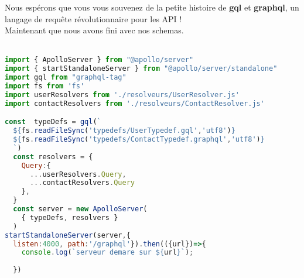 \documentclass{article}
\begin{document}
Nous espérons que vous vous souvenez de la petite histoire de \textbf{gql} et \textbf{graphql}, un langage de requête révolutionnaire pour les API !  \faSmileO\\
Maintenant que nous avons fini avec nos schemas.\\\\
\begin{lstlisting}[language=JavaScript]
import { ApolloServer } from "@apollo/server"
import { startStandaloneServer } from "@apollo/server/standalone"
import gql from "graphql-tag"
import fs from 'fs'
import userResolvers from './resolveurs/UserResolver.js'
import contactResolvers from './resolveurs/ContactResolver.js'

const  typeDefs = gql(`
  ${fs.readFileSync('typedefs/UserTypedef.gql','utf8')}
  ${fs.readFileSync('typedefs/ContactTypedef.graphql','utf8')}
  `)  
  const resolvers = {
    Query:{
      ...userResolvers.Query,
      ...contactResolvers.Query
    },
  }
  const server = new ApolloServer(
    { typeDefs, resolvers }
  )
startStandaloneServer(server,{
  listen:4000, path:'/graphql'}).then(({url})=>{
    console.log(`serveur demare sur ${url}`);
    
  })
  
 \end{lstlisting}
\end{document}
